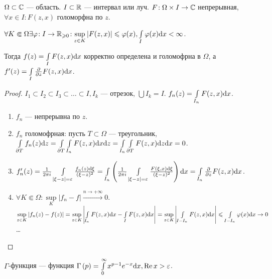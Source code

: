 \begin{lemma}
    $\Omega \subset \mathbb{C}$ --- область.  $I \subset \mathbb{R}$ --- интервал или луч.  $F\!: \Omega \times I \to \mathbb{C}$ непрерывная, $\forall x \in I\!: F(z, x)$ голоморфна по  $z$.

     $\forall K \Subset \Omega\exists \varphi\!: I \to \mathbb{R}_{\geqslant  0}\!: \sup\limits_{z \in K} \left| F(z, x) \right| \leqslant  \varphi(x), \int\limits_{I} \varphi(x) \mathrm{d}x < \infty$. 

     Тогда $f(z) = \int\limits_{I} F(z, x) \mathrm{d}x$ корректно определена и голомофрна в $\Omega$, а  $f'(z) = \int\limits_{I} \frac{\partial}{\partial z} F(z, x) \mathrm{d}x$.
\end{lemma}
\begin{proof}
   $I_1 \subset I_2 \subset I_3 \subset \ldots \subset I, I_k$ --- отрезок, $\bigcup I_k = I$.  $f_n(z) = \int\limits_{I_n} F(z, x) \mathrm{d}x$.
   \begin{enumerate}
       \item $f_n$ --- непрерывна по  $z$.
       \item  $f_n$ голомофрная: пусть  $T \subset \Omega$ --- треугольник,  $\int\limits_{\partial T} f_n(z)\mathrm{d}z = \int\limits_{\partial T}\int\limits_{I_n} F(z, x) \mathrm{d}x \mathrm{d}z = \int\limits_{I_n} \int\limits_{\partial T} F(z, x) \mathrm{d}z \mathrm{d}x = 0$.
       \item $f'_n(z) = \frac{1}{2 \pi i} \int\limits_{\left| \xi - z \right|  = \varepsilon} \frac{f_n(z)\mathrm{d}\xi}{(\xi - z)^2} = \int\limits_{I_n} \left( \frac{1}{2\pi i} \int\limits_{\left| \xi - z \right| = \varepsilon} \frac{F(\xi, x)\mathrm{d}\xi}{(\xi - z)^2} \right) \mathrm{d}x = \int\limits_{I_n} \frac{\partial}{\partial z}F(z, x)\mathrm{d}x$.
       \item $\forall K \Subset \Omega\!: \sup\limits_{K} \left| f_n - f \right| \xrightarrow{n \to +\infty} 0$. $\sup\limits_{z \in K} |f_n(z) - f(z)| = \sup\limits_{z \in K}\left| \int\limits_{I_n} F(z, x) \mathrm{d}x - \int\limits_{I} F(z, x) \mathrm{d}x \right| = \sup\limits_{z \in K} \left| \int\limits_{I - I_n} F(z, x)\mathrm{d}x \right| \leqslant  \int\limits_{I - I_n} \varphi(x) \mathrm{d}x \to 0$\dots 
   \end{enumerate}
\end{proof}
\begin{definition}
    $\Gamma$-функция --- функция  $\Gamma\left( p  \right) = \int\limits_{0}^\infty x^{p -1}e^{-x}\mathrm{d}x, \operatorname{Re} x > \varepsilon$.
\end{definition}
